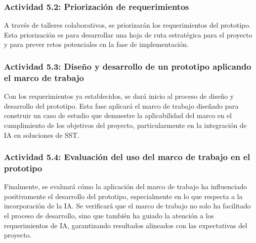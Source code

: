 \subsubsection{Actividad 5.2: Priorización de requerimientos}
A través de talleres colaborativos, se priorizarán los requerimientos del prototipo. Esta priorización es para desarrollar una hoja de ruta estratégica para el proyecto y para prever retos potenciales en la fase de implementación.

\subsubsection{Actividad 5.3: Diseño y desarrollo de un prototipo aplicando el marco de trabajo}
Con los requerimientos ya establecidos, se dará inicio al proceso de diseño y desarrollo del prototipo. Esta fase aplicará el marco de trabajo diseñado para construir un caso de estudio que demuestre la aplicabilidad del marco en el cumplimiento de los objetivos del proyecto, particularmente en la integración de IA en soluciones de SST.

\subsubsection{Actividad 5.4: Evaluación del uso del marco de trabajo en el prototipo}
Finalmente, se evaluará cómo la aplicación del marco de trabajo ha influenciado positivamente el desarrollo del prototipo, especialmente en lo que respecta a la incorporación de la IA. Se verificará que el marco de trabajo no solo ha facilitado el proceso de desarrollo, sino que también ha guiado la atención a los requerimientos de IA, garantizando resultados alineados con las expectativas del proyecto.










